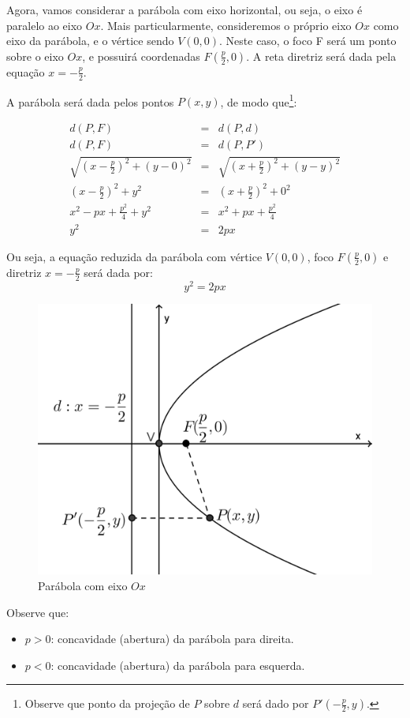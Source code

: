 Agora, vamos considerar a parábola com eixo horizontal, ou seja, o eixo é paralelo ao eixo $Ox$. Mais particularmente, consideremos o próprio eixo $Ox$ como eixo da parábola, e o vértice sendo $V(0, 0)$. Neste caso, o foco F será um ponto sobre o eixo $Ox$, e possuirá coordenadas $\displaystyle F\left(\frac{p}{2}, 0\right)$. A reta diretriz será dada pela equação $\displaystyle x=-\frac{p}{2}$.

A parábola será dada pelos pontos $P(x, y)$, de modo que\footnote{Observe que ponto da projeção de $P$ sobre $d$ será dado por $P'(-\frac{p}{2},y)$.}:

\begin{eqnarray*}
d(P, F) & = & d(P, d)   \\
d(P, F) & = & d(P, P')   \\
\sqrt{\left(x-\frac{p}{2}\right)^2+(y-0)^2} & = & \sqrt{\left(x+\frac{p}{2}\right)^2+(y-y)^2}  \\
\left(x-\frac{p}{2}\right)^2+y^2 & = & \left(x+\frac{p}{2}\right)^2+0^2  \\
x^2-px+\frac{p^2}{4}+y^2 & = & x^2+px+\frac{p^2}{4}   \\
y^2 & = & 2px 
\end{eqnarray*}

Ou seja, a equação reduzida da parábola com vértice $V(0, 0)$, foco $F(\frac{p}{2},0)$ e diretriz $\displaystyle x=-\frac{p}{2}$ será dada por: $$y^2=2px$$

\begin{figure}[H]
\centering
\includegraphics[width=0.5\linewidth]{analitica/imagens/parabolah1.png}
\caption{Parábola com eixo $Ox$}
\label{fig:parah1}
\end{figure}

Observe que:
\begin{itemize}
  \item $p>0$: concavidade (abertura) da parábola para direita.
  \item $p<0$: concavidade (abertura) da parábola para esquerda.
\end{itemize}

